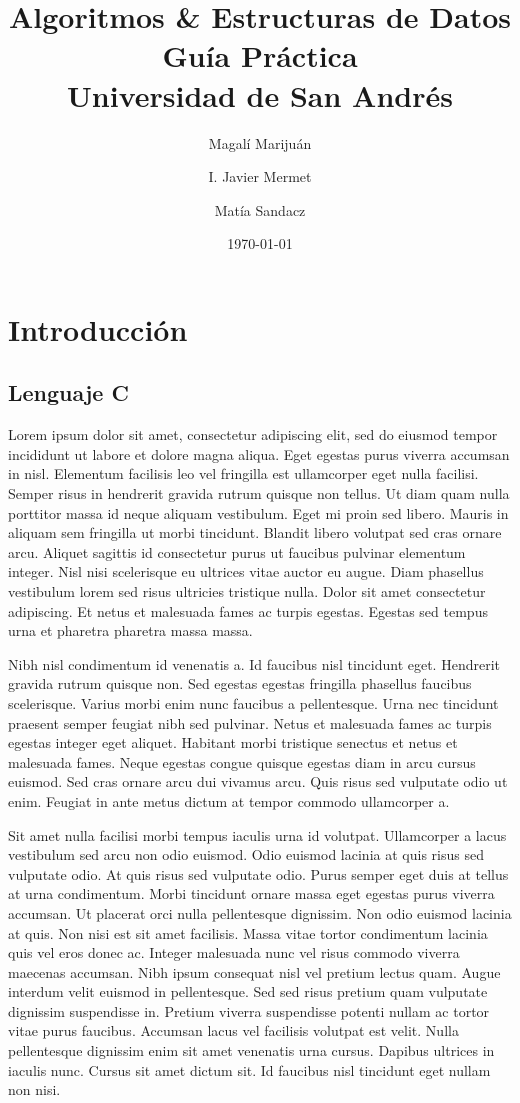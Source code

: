 \documentclass[titlepage,oneside]{book}
\title{
	Algoritmos \& Estructuras de Datos\\
	\large Guía Práctica \\
	\large Universidad de San Andrés
}
\author{Magalí Marijuán\\
	\and
	I. Javier Mermet
	\and
	Matía Sandacz
}
\date{\today}
\begin{document}
\maketitle
\tableofcontents

\part{Introducción}
\chapter{Lenguaje C}

Lorem ipsum dolor sit amet, consectetur adipiscing elit, sed do eiusmod tempor incididunt ut labore et dolore magna aliqua. Eget egestas purus viverra accumsan in nisl. Elementum facilisis leo vel fringilla est ullamcorper eget nulla facilisi. Semper risus in hendrerit gravida rutrum quisque non tellus. Ut diam quam nulla porttitor massa id neque aliquam vestibulum. Eget mi proin sed libero. Mauris in aliquam sem fringilla ut morbi tincidunt. Blandit libero volutpat sed cras ornare arcu. Aliquet sagittis id consectetur purus ut faucibus pulvinar elementum integer. Nisl nisi scelerisque eu ultrices vitae auctor eu augue. Diam phasellus vestibulum lorem sed risus ultricies tristique nulla. Dolor sit amet consectetur adipiscing. Et netus et malesuada fames ac turpis egestas. Egestas sed tempus urna et pharetra pharetra massa massa.

Nibh nisl condimentum id venenatis a. Id faucibus nisl tincidunt eget. Hendrerit gravida rutrum quisque non. Sed egestas egestas fringilla phasellus faucibus scelerisque. Varius morbi enim nunc faucibus a pellentesque. Urna nec tincidunt praesent semper feugiat nibh sed pulvinar. Netus et malesuada fames ac turpis egestas integer eget aliquet. Habitant morbi tristique senectus et netus et malesuada fames. Neque egestas congue quisque egestas diam in arcu cursus euismod. Sed cras ornare arcu dui vivamus arcu. Quis risus sed vulputate odio ut enim. Feugiat in ante metus dictum at tempor commodo ullamcorper a.

Sit amet nulla facilisi morbi tempus iaculis urna id volutpat. Ullamcorper a lacus vestibulum sed arcu non odio euismod. Odio euismod lacinia at quis risus sed vulputate odio. At quis risus sed vulputate odio. Purus semper eget duis at tellus at urna condimentum. Morbi tincidunt ornare massa eget egestas purus viverra accumsan. Ut placerat orci nulla pellentesque dignissim. Non odio euismod lacinia at quis. Non nisi est sit amet facilisis. Massa vitae tortor condimentum lacinia quis vel eros donec ac. Integer malesuada nunc vel risus commodo viverra maecenas accumsan. Nibh ipsum consequat nisl vel pretium lectus quam. Augue interdum velit euismod in pellentesque. Sed sed risus pretium quam vulputate dignissim suspendisse in. Pretium viverra suspendisse potenti nullam ac tortor vitae purus faucibus. Accumsan lacus vel facilisis volutpat est velit. Nulla pellentesque dignissim enim sit amet venenatis urna cursus. Dapibus ultrices in iaculis nunc. Cursus sit amet dictum sit. Id faucibus nisl tincidunt eget nullam non nisi.
\end{document}
